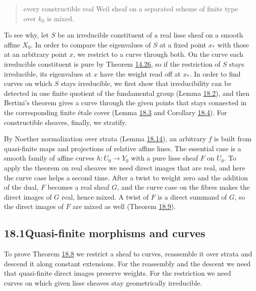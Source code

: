 \documentclass[11pt]{article}
\begin{document}
\begin{quote}
every constructible real Weil sheaf on a separated scheme of finite type over \(k_0\) is mixed.
\end{quote}

To see why, let \(S\) be an irreducible constituent of a real lisse sheaf on a smooth affine \(X_0\). In order to compare the eigenvalues of \(S\) at a fixed point \(x_*\) with those at an arbitrary point \(x\), we restrict to a curve through both. On the curve each irreducible constituent is pure by Theorem \hyperref[bp120]{14.26}, so if the restriction of \(S\) stays irreducible, its eigenvalues at \(x\) have the weight read off at \(x_*\). In order to find curves on which \(S\) stays irreducible, we first show that irreducibility can be detected in one finite quotient of the fundamental group (Lemma \hyperref[bp278]{18.2}), and then Bertini's theorem gives a curve through the given points that stays connected in the corresponding finite étale cover (Lemma \hyperref[bp281]{18.3} and Corollary \hyperref[bp284]{18.4}). For constructible sheaves, finally, we stratify.

By Noether normalization over strata (Lemma \hyperref[bp312]{18.14}), an arbitrary \(f\) is built from quasi-finite maps and projections of relative affine lines. The essential case is a smooth family of affine curves \(h:U_0\to Y_0\) with a pure lisse sheaf \(F\) on \(U_0\). To apply the theorem on real sheaves we need direct images that are real, and here the curve case helps a second time. After a twist to weight zero and the addition of the dual, \(F\) becomes a real sheaf \(G\), and the curve case on the fibres makes the direct images of \(G\) real, hence mixed. A twist of \(F\) is a direct summand of \(G\), so the direct images of \(F\) are mixed as well (Theorem \hyperref[bp299]{18.9}).

\subsection*{\texorpdfstring{18.1\quad Quasi-finite morphisms and curves}{18.1 Quasi-finite morphisms and curves}}
\label{bp273}%
\label{bp274}%
To prove Theorem \hyperref[bp295]{18.8} we restrict a sheaf to curves, reassemble it over strata and descend it along constant extensions. For the reassembly and the descent we need that quasi-finite direct images preserve weights. For the restriction we need curves on which given lisse sheaves stay geometrically irreducible.
\end{document}
